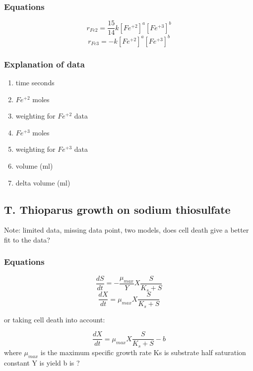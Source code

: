 \documentclass[10pt]{article}
\theoremstyle{plain}
\begin{document}
\subsubsection{Equations} 
\begin{equation}
r_{Fe2} = \frac{15}{14}k[Fe^{+2}]^a[Fe^{+3}]^b 
\end{equation}
\begin{equation}
r_{Fe3} = -k[Fe^{+2}]^a[Fe^{+3}]^b
\end{equation}

\subsubsection{Explanation of data}
\begin{enumerate}
\item time seconds
\item $Fe^{+2}$ moles
\item weighting for $Fe^{+2}$ data
\item $Fe^{+3}$ moles
\item weighting for $Fe^{+3}$ data
\item volume (ml)
\item delta volume (ml)
\end{enumerate}

\subsection{T. Thioparus growth on sodium thiosulfate}
Note: limited data, missing data point, two models, does cell death
give a better fit to the data?
\subsubsection{Equations}
\begin{equation}
\frac{dS}{dt} = -\frac{\mu_{max}}{Y} X \frac{S}{K_s + S}
\end{equation}
\begin{equation}
\frac{dX}{dt} = \mu_{max} X \frac{S}{K_s + S}
\end{equation}

or taking cell death into account:

\begin{equation}
\frac{dX}{dt} = \mu_{max} X \frac{S}{K_s + S} - b
\end{equation}
where $\mu_{max}$ is the maximum specific growth rate
Ks is substrate half saturation constant
Y is yield 
b is ?
\end{document}
